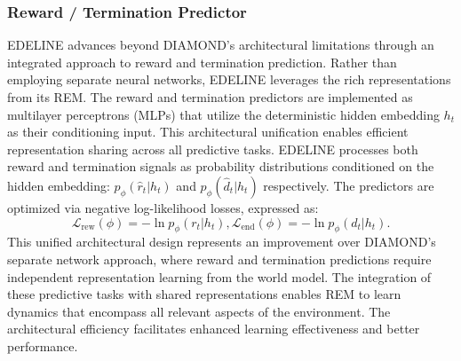 \subsubsection{Reward / Termination Predictor}
EDELINE advances beyond DIAMOND's architectural limitations through an integrated approach to reward and termination prediction. Rather than employing separate neural networks, EDELINE leverages the rich representations from its REM. The reward and termination predictors are implemented as multilayer perceptrons (MLPs) that utilize the deterministic hidden embedding $h_t$ as their conditioning input. This architectural unification enables efficient representation sharing across all predictive tasks. EDELINE processes both reward and termination signals as probability distributions conditioned on the hidden embedding: $p_\phi(\hat{r}_t|h_t)$ and $p_\phi(\hat{d}_t|h_t)$ respectively. The predictors are optimized via negative log-likelihood losses, expressed as:
\begin{equation}
\mathcal{L}_{\text{rew}}(\phi) = -\ln p_\phi(r_t|h_t),
\mathcal{L}_{\text{end}}(\phi) = -\ln p_\phi(d_t|h_t).
\end{equation}
This unified architectural design represents an improvement over DIAMOND's separate network approach, where reward and termination predictions require independent representation learning from the world model. The integration of these predictive tasks with shared representations enables REM to learn dynamics that encompass all relevant aspects of the environment. The architectural efficiency facilitates enhanced learning effectiveness and better performance.
\vspace{-0.5em}



